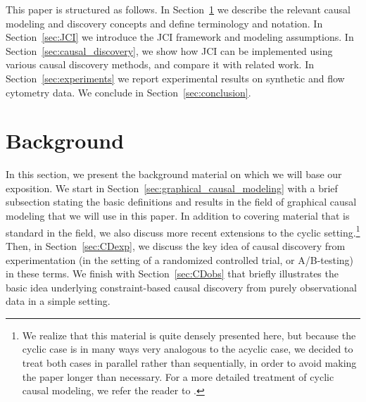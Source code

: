 \documentclass[twoside,11pt]{article}
\begin{document}

This paper is structured as follows. In Section~\ref{sec:background} we describe the relevant causal
modeling and discovery concepts and define terminology and notation. In Section~\ref{sec:JCI} we
introduce the JCI framework and modeling assumptions. In Section~\ref{sec:causal_discovery}, 
we show how JCI can be implemented using various causal discovery methods, 
and compare it with related work. In Section~\ref{sec:experiments} we
report experimental results on synthetic and flow cytometry data. We conclude in Section~\ref{sec:conclusion}.


\section{Background}\label{sec:background}

In this section, we present the background material on which we will base our
exposition. We start in Section~\ref{sec:graphical_causal_modeling} 
with a brief subsection stating the basic definitions and
results in the field of graphical causal modeling that 
we will use in this paper. In
addition to covering material that is standard in the field,
we also discuss more recent extensions to the cyclic setting.\footnote{We realize that 
this material is quite densely presented here, but because the cyclic case is in many
ways very analogous to the acyclic case, we decided to treat both cases in parallel rather 
than sequentially, in order to avoid making the paper longer than necessary. For a more
detailed treatment of cyclic causal modeling, we refer the reader to \citet{Bongers++_1611.06221v2}.}
Then, in Section~\ref{sec:CDexp}, we discuss the key
idea of causal discovery from experimentation (in the setting of a randomized
controlled trial, or A/B-testing) in these terms. We finish with Section~\ref{sec:CDobs}
that briefly illustrates the basic idea underlying constraint-based causal discovery 
from purely observational data in a simple setting.
\end{document}
